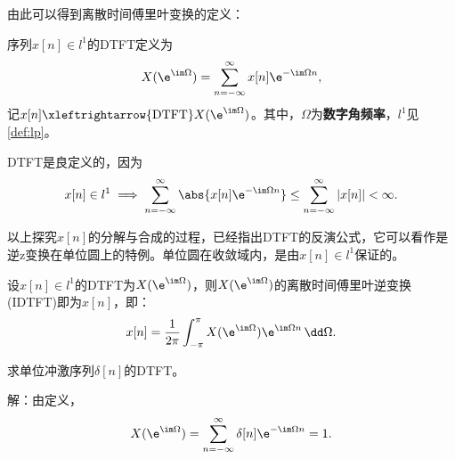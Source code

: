 由此可以得到离散时间傅里叶变换的定义：

\begin{definition}[离散时间傅里叶变换]\label{def:DTFT}
    序列$x[n]\in l^1$的DTFT定义为
    \begin{equation}
        X(\e^{\im\Omega})=\sum_{n=-\infty}^{\infty}x[n]\e^{-\im\Omega n},
    \end{equation}
    记$x[n]\xleftrightarrow{\mathrm{DTFT}}X(\e^{\im\Omega})$。其中，$\Omega$为\textbf{数字角频率}，$l^1$见\cref{def:lp}。
\end{definition}

DTFT是良定义的，因为
\begin{equation}
    x[n]\in l^1\implies \sum_{n=-\infty}^{\infty}\abs{x[n]\e^{-\im\Omega n}}\leq \sum_{n=-\infty}^{\infty}|x[n]|<\infty.
\end{equation}

以上探究$x[n]$的分解与合成的过程，已经指出DTFT的反演公式，它可以看作是逆z变换在单位圆上的特例。单位圆在收敛域内，是由$x[n]\in l^1$保证的。
\begin{theorem}[离散时间傅里叶反演公式]\label{thm:DTFT_inv}
    设$x[n]\in l^1$的DTFT为$X(\e^{\im\Omega})$，则$X(\e^{\im\Omega})$的离散时间傅里叶逆变换(IDTFT)即为$x[n]$，即：
    \begin{equation}
        x[n]=\frac{1}{2\pi}\int_{-\pi}^{\pi}X(\e^{\im\Omega})\e^{\im\Omega n}\,\dd\Omega.
    \end{equation}
\end{theorem}

\begin{example}
    求单位冲激序列$\delta[n]$的DTFT。

    解：由定义，
    \begin{equation}
        X(\e^{\im\Omega})=\sum_{n=-\infty}^{\infty}\delta[n]\e^{-\im\Omega n}=1.
    \end{equation}
\end{example}

